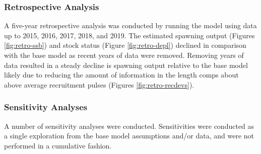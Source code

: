 \documentclass[11pt,
  english,
  a4paper,
]{article}
\begin{document}
\leavevmode\tagmcend\tagstructend\par


\hypertarget{retrospective-analysis}{%
\subsubsection{Retrospective Analysis}\label{retrospective-analysis}}

\leavevmode\tagmcend\tagstructend


A five-year retrospective analysis was conducted by running the model using data up to 2015, 2016, 2017, 2018, and 2019. The estimated spawning output (Figures \ref{fig:retro-ssb}) and stock status (Figure \ref{fig:retro-depl}) declined in comparison with the base model as recent years of data were removed. Removing years of data resulted in a steady decline is spawning output relative to the base model likely due to reducing the amount of information in the length comps about above average recruitment pulses (Figures \ref{fig:retro-recdevs}).

\leavevmode\tagmcend\tagstructend\par


\hypertarget{sensitivity-analyses}{%
\subsubsection{Sensitivity Analyses}\label{sensitivity-analyses}}

\leavevmode\tagmcend\tagstructend


A number of sensitivity analyses were conducted. Sensitivities were conducted as a single exploration from the base model assumptions and/or data, and were not performed in a cumulative fashion.

\leavevmode\tagmcend\tagstructend\par
\end{document}
